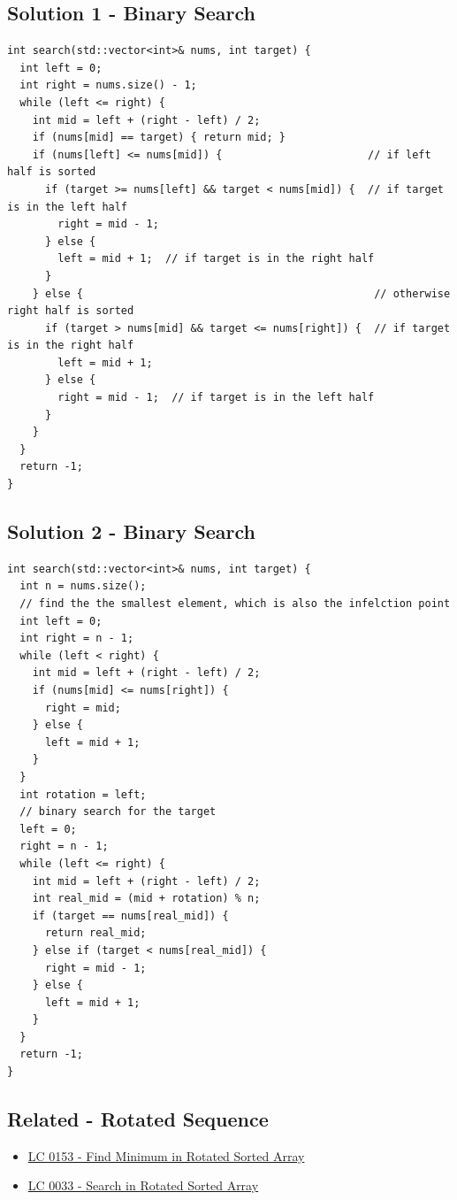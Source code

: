 \subsection*{Solution 1 - Binary Search}
\begin{lstlisting}
int search(std::vector<int>& nums, int target) {
  int left = 0;
  int right = nums.size() - 1;
  while (left <= right) {
    int mid = left + (right - left) / 2;
    if (nums[mid] == target) { return mid; }
    if (nums[left] <= nums[mid]) {                       // if left half is sorted
      if (target >= nums[left] && target < nums[mid]) {  // if target is in the left half
        right = mid - 1;
      } else {
        left = mid + 1;  // if target is in the right half
      }
    } else {                                              // otherwise right half is sorted
      if (target > nums[mid] && target <= nums[right]) {  // if target is in the right half
        left = mid + 1;
      } else {
        right = mid - 1;  // if target is in the left half
      }
    }
  }
  return -1;
}
\end{lstlisting}

\subsection*{Solution 2 - Binary Search}
\begin{lstlisting}
int search(std::vector<int>& nums, int target) {
  int n = nums.size();
  // find the the smallest element, which is also the infelction point
  int left = 0;
  int right = n - 1;
  while (left < right) {
    int mid = left + (right - left) / 2;
    if (nums[mid] <= nums[right]) {
      right = mid;
    } else {
      left = mid + 1;
    }
  }
  int rotation = left;
  // binary search for the target
  left = 0;
  right = n - 1;
  while (left <= right) {
    int mid = left + (right - left) / 2;
    int real_mid = (mid + rotation) % n;
    if (target == nums[real_mid]) {
      return real_mid;
    } else if (target < nums[real_mid]) {
      right = mid - 1;
    } else {
      left = mid + 1;
    }
  }
  return -1;
}
\end{lstlisting}

\subsection*{Related - Rotated Sequence}
\begin{itemize}
\item \hyperref[lc0153]{LC 0153 - Find Minimum in Rotated Sorted Array}
\item \hyperref[lc0033]{LC 0033 - Search in Rotated Sorted Array}
\end{itemize}

